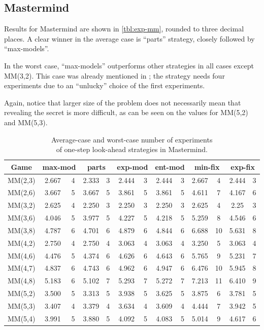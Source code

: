 \subsection{Mastermind}

Results for Mastermind are shown in \autoref{tbl:exp-mm},
  rounded to three decimal places.
A clear winner in the average case is ``parts'' strategy,
  closely followed by ``max-models''.

In the worst case, ``max-models'' outperforms other
  strategies in all cases except MM(3,2).
This case was already mentioned in ;
  the strategy needs four experiments due to an ``unlucky''
  choice of the first experiments.

Again, notice that larger size of the problem does not necessarily mean that
  revealing the secret is more difficult,
  as can be seen on the values for MM(5,2) and MM(5,3).

\begin{table}[h]
\begin{center}
\begin{tabular}{|c|c|c|c|c|c|c|c|c|c|c|c|c|}\hline
Game & \multicolumn{2}{c|}{max-mod} & \multicolumn{2}{c|}{parts}
& \multicolumn{2}{c|}{exp-mod} & \multicolumn{2}{c|}{ent-mod}
& \multicolumn{2}{c|}{min-fix} & \multicolumn{2}{c|}{exp-fix}\\ \hline
MM(2,3) & 2.667 & 4 & 2.333 & 3 & 2.444 & 3 & 2.444 & 3 & 2.667 & 4 & 2.444 & 3 \\
MM(2,6) & 3.667 & 5 & 3.667 & 5 & 3.861 & 5 & 3.861 & 5 & 4.611 & 7 & 4.167 & 6 \\\hline
MM(3,2) & 2.625 & 4 & 2.250 & 3 & 2.250 & 3 & 2.250 & 3 & 2.625 & 4 & 2.25 &  3 \\
MM(3,6) & 4.046 & 5 & 3.977 & 5 & 4.227 & 5 & 4.218 & 5 & 5.259 & 8 & 4.546 & 6 \\
MM(3,8) & 4.787 & 6 & 4.701 & 6 & 4.879 & 6 & 4.844 & 6 & 6.688 & 10 & 5.631 & 8 \\\hline
MM(4,2) & 2.750 & 4 & 2.750 & 4 & 3.063 & 4 & 3.063 & 4 & 3.250 & 5 & 3.063 & 4 \\
MM(4,6) & 4.476 & 5 & 4.374 & 6 & 4.626 & 6 & 4.643 & 6 & 5.765 & 9 & 5.231 & 7 \\
MM(4,7) & 4.837 & 6 & 4.743 & 6 & 4.962 & 6 & 4.947 & 6 & 6.476 & 10 & 5.945 & 8 \\
MM(4,8) & 5.183 & 6 & 5.102 & 7 & 5.293 & 7 & 5.272 & 7 & 7.213 & 11 & 6.410 & 9 \\\hline
MM(5,2) & 3.500 & 5 & 3.313 & 5 & 3.938 & 5 & 3.625 & 5 & 3.875 & 6 & 3.781 & 5 \\
MM(5,3) & 3.407 & 4 & 3.379 & 4 & 3.634 & 4 & 3.609 & 4 & 4.444 & 7 & 3.942 & 5 \\
MM(5,4) & 3.991 & 5 & 3.880 & 5 & 4.092 & 5 & 4.083 & 5 & 5.014 & 9 & 4.617 & 6 \\\hline
\end{tabular}
\caption{Average-case and worst-case number of experiments\\
  of one-step look-ahead strategies in Mastermind.}
\label{tbl:exp-mm}
\end{center}
\end{table}


